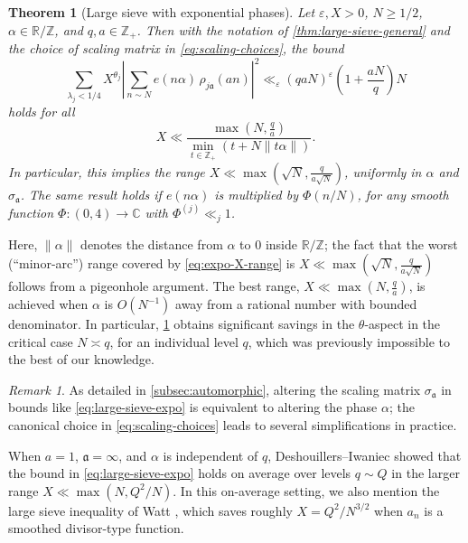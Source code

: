 \documentclass[reqno,11pt]{amsart}
\newtheorem{theorem}{Theorem}%
\theoremstyle{remark}
\newtheorem*{remark}{Remark}
\numberwithin{equation}{section}
\newcommand{\Z}{\mathbb{Z}}
\newcommand{\R}{\mathbb{R}}
\newcommand{\C}{\mathbb{C}}
\newcommand{\ma}{\mathfrak{a}}
\newcommand{\eps}{\varepsilon}
\begin{document}
\begin{theorem}[Large sieve with exponential phases] \label{thm:large-sieve-expo-phases}
Let $\eps, X > 0$, $N \ge 1/2$, $\alpha \in \R/\Z$, and $q, a \in \Z_+$. Then with the notation of \cref{thm:large-sieve-general} and the choice of scaling matrix in \cref{eq:scaling-choices}, the bound
\begin{equation} \label{eq:large-sieve-expo}
    \sum_{\lambda_j < 1/4}
    X^{\theta_j} 
    \left\vert 
    \sum_{n \sim N} e(n\alpha)\, \rho_{j\ma}(an)
    \right\vert^2 
    \ll_\eps 
    (qaN)^\eps
    \left(1 + \frac{aN}{q}\right) N
\end{equation}
holds for all
\begin{equation} \label{eq:expo-X-range}
        X \ll \frac{\max\left(N, \frac{q}{a}\right)}{\min_{t \in \Z_+} \left(t + N\|t\alpha\| \right)}.
\end{equation}
In particular, this implies the range $X \ll \max(\sqrt{N}, \tfrac{q}{a\sqrt{N}})$, uniformly in $\alpha$ and $\sigma_{\ma}$.
The same result holds if $e(n\alpha)$ is multiplied by $\Phi(n/N)$, for any smooth function  $\Phi : (0, 4) \to \C$ with $\Phi^{(j)} \ll_j 1$.
\end{theorem}

Here, $\|\alpha\|$ denotes the distance from $\alpha$ to $0$ inside $\R/\Z$; the fact that the worst (``minor-arc'') range covered by \cref{eq:expo-X-range} is $X \ll \max(\sqrt{N}, \tfrac{q}{a\sqrt{N}})$ follows from a pigeonhole argument. The best range, $X \ll \max(N, \tfrac{q}{a})$, is achieved when $\alpha$ is $O(N^{-1})$ away from a rational number with bounded denominator.
In particular, \cref{thm:large-sieve-expo-phases} obtains significant savings in the $\theta$-aspect in the critical case $N \asymp q$, for an individual level $q$, which was previously impossible to the best of our knowledge.

\begin{remark}
As detailed in \cref{subsec:automorphic}, altering the scaling matrix $\sigma_{\ma}$ in bounds like \cref{eq:large-sieve-expo} is equivalent to altering the phase $\alpha$; the canonical choice in \cref{eq:scaling-choices} leads to several simplifications in practice.
\end{remark}

When $a = 1$, $\ma = \infty$, and $\alpha$ is independent of $q$, Deshouillers--Iwaniec \cite[Theorem 7]{deshouillers1982kloosterman} showed that the bound in \cref{eq:large-sieve-expo} holds on average over levels $q \sim Q$ in the larger range $X \ll \max(N, Q^2/N)$. In this on-average setting, we also mention the large sieve inequality of Watt \cite[Theorem 2]{watt1995kloosterman}, which saves roughly $X = Q^2/N^{3/2}$ when $a_n$ is a smoothed divisor-type function.
\end{document}
